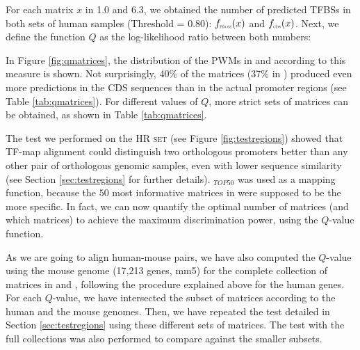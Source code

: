 For each matrix $x$ in  1.0 and  6.3, we obtained the number of predicted TFBSs 
in both sets of human samples (Threshold = 0.80): $f_{\textnormal{\scalebox{0.5}{PROM}}}(x)$ and 
$f_{\textnormal{\scalebox{0.5}{CDS}}}(x)$. Next, we define the function $Q$ as the log-likelihood 
ratio between both numbers:

\begin{center}
\end{center}

In Figure \ref{fig:qmatrices}, the distribution of the 
PWMs in  and  according to this measure is shown. Not surprisingly, 40\% of the 
 matrices (37\% in ) produced even more predictions in the CDS sequences than 
in the actual promoter regions (see Table \ref{tab:qmatrices}). For different values of
$Q$, more strict sets of matrices can be obtained, as shown in Table \ref{tab:qmatrices}.

The test we performed on the \textsc{HR set} (see Figure \ref{fig:testregions}) showed that 
TF-map alignment could distinguish two orthologous promoters better than any other
pair of orthologous genomic samples, even with lower sequence similarity (see Section 
\ref{sec:testregions} for further details). $_{TOP50}$ was used as a mapping function,
because the $50$ most informative matrices in  were supposed to be the more specific.
In fact, we can now quantify the optimal number of matrices (and which matrices) to achieve
the maximum discrimination power, using the $Q$-value function.

As we are going to align human-mouse pairs, we have also computed the $Q$-value using the mouse 
genome (17,213 genes, mm5) for the complete collection of matrices in  and , 
following the procedure explained above for the human genes. For each $Q$-value, we have
intersected the subset of matrices according to the human and the mouse genomes. Then, we have 
repeated the test detailed in Section \ref{sec:testregions} using these different sets of matrices.
The test with the full collections was also performed to compare against the smaller subsets.

